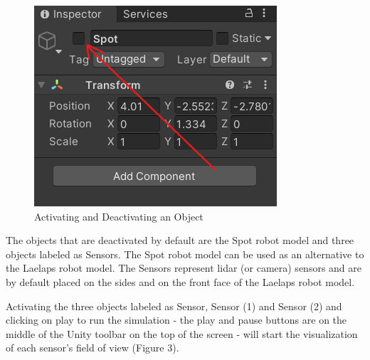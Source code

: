 \documentclass{article}
\begin{document}
\begin{figure}[h] %
	\centering
	\includegraphics[width=1\columnwidth]{FOV(2).png} %
	\caption{Activating and Deactivating an Object}
\end{figure}
\clearpage

The objects that are deactivated by default are the Spot robot model and three objects labeled as Sensors. The Spot robot model can be used as an alternative to the Laelaps robot model. The Sensors represent lidar (or camera) sensors and are by default placed on the sides and on the front face of the Laelaps robot model. 

Activating the three objects labeled as Sensor, Sensor (1) and Sensor (2) and clicking on play to run the simulation - the play and pause buttons are on the middle of the Unity toolbar on the top of the screen - will start the visualization of each sensor's field of view (Figure 3). 
\end{document}
